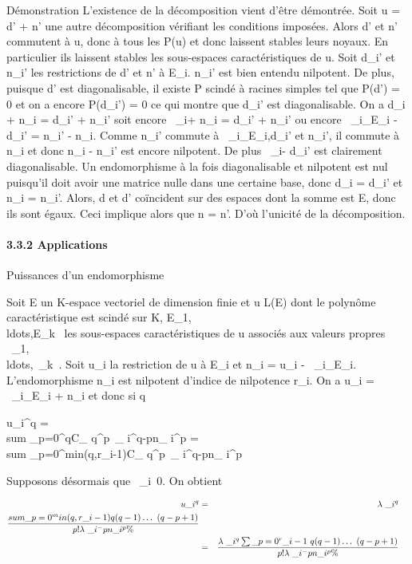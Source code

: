 \documentclass[]{article}
\begin{document}
Démonstration L'existence de la décomposition vient d'être démontrée.
Soit u = d' + n' une autre décomposition vérifiant les conditions
imposées. Alors d' et n' commutent à u, donc à tous les P(u) et donc
laissent stables leurs noyaux. En particulier ils laissent stables les
sous-espaces caractéristiques de u. Soit d\_i' et n\_i'
les restrictions de d' et n' à E\_i. n\_i' est bien
entendu nilpotent. De plus, puisque d' est diagonalisable, il existe P
scindé à racines simples tel que P(d') = 0 et on a encore
P(d\_i') = 0 ce qui montre que d\_i' est diagonalisable.
On a d\_i + n\_i = d\_i' + n\_i' soit
encore \lambda~\_i\mathrmId + n\_i =
d\_i' + n\_i' ou encore
\lambda~\_i\mathrmId\_E\_i -
d\_i' = n\_i' - n\_i. Comme n\_i'
commute à
\lambda~\_i\mathrmId\_E\_i,d\_i'
et n\_i', il commute à n\_i et donc n\_i -
n\_i' est encore nilpotent. De plus
\lambda~\_i\mathrmId - d\_i' est clairement
diagonalisable. Un endomorphisme à la fois diagonalisable et nilpotent
est nul puisqu'il doit avoir une matrice nulle dans une certaine base,
donc d\_i = d\_i' et n\_i = n\_i'.
Alors, d et d' coïncident sur des espaces dont la somme est E, donc ils
sont égaux. Ceci implique alors que n = n'. D'où l'unicité de la
décomposition.

\paragraph{3.3.2 Applications}

Puissances d'un endomorphisme

Soit E un K-espace vectoriel de dimension finie et u \in L(E) dont le
polynôme caractéristique est scindé sur K,
E\_1,\\ldots,E\_k~
les sous-espaces caractéristiques de u associés aux valeurs propres
\lambda~\_1,\\ldots,\lambda~\_k~.
Soit u\_i la restriction de u à E\_i et n\_i =
u\_i -
\lambda~\_i\mathrmId\_E\_i.
L'endomorphisme n\_i est nilpotent d'indice de nilpotence
r\_i. On a u\_i =
\lambda~\_i\mathrmId\_E\_i +
n\_i et donc si q \in {}~

u\_i^q = \\sum
\_p=0^qC\_ q^p\lambda~\_
i^q-pn\_ i^p = \\sum
\_p=0^min(q,r\_i-1)C\_
q^p\lambda~\_ i^q-pn\_ i^p

Supposons désormais que \lambda~\_i\neq~0. On
obtient

\begin{align*} u\_i^q& =& \lambda~\_
i^q \\sum
\_p=0^min(q,r\_i-1) q(q -
1)\ldots~(q - p + 1) \over
p! \lambda~\_i^-pn\_ i^p\%&
\\ & =& \lambda~\_i^q
\sum \_p=0^r\_i-1~ q(q -
1)\ldots~(q - p + 1) \over
p! \lambda~\_i^-pn\_ i^p \%&
\\ \end{align*}
\end{document}
